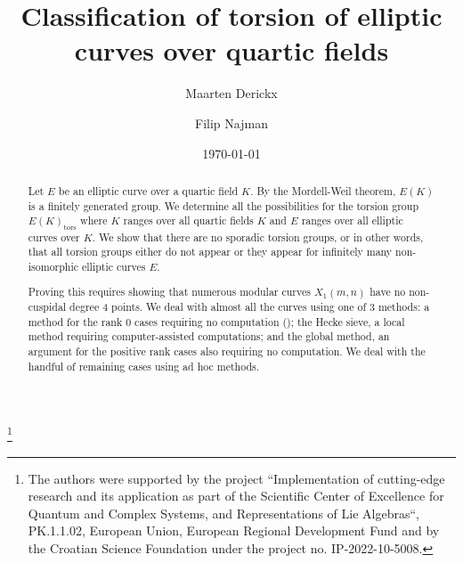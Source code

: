 \documentclass[11pt,reqno]{amsart}
\title{Classification of torsion of elliptic curves over quartic fields}
\date{\today}
\theoremstyle{definition}
\numberwithin{equation}{section}
\newcommand{\tor}{\mathrm{tors}}
\begin{document}
\begin{abstract}
Let $E$ be an elliptic curve over a quartic field $K$. By the Mordell-Weil theorem, $E(K)$ is a finitely generated group. We determine all the possibilities for the torsion group $E(K)_\tor$ where $K$ ranges over all quartic fields $K$ and $E$ ranges over all elliptic curves over $K$. We show that there are no sporadic torsion groups, or in other words, that all torsion groups either do not appear or they appear for infinitely many non-isomorphic elliptic curves $E$.

Proving this requires showing that numerous modular curves $X_1(m,n)$ have no non-cuspidal degree $4$ points. We deal with almost all the curves using one of 3 methods: a method for the rank 0 cases requiring no computation (); the Hecke sieve, a local method requiring computer-assisted computations; and the global method, an argument for the positive rank cases also requiring no computation. We deal with the handful of remaining cases using ad hoc methods.



\end{abstract}

\author[Derickx]{Maarten Derickx}
\address{Maarten Derickx, University of Zagreb, Faculty of Science, Department of Mathematics, Bijeni\v{c}ka Cesta 30, 10000 Zagreb, Croatia}


\author[Najman]{Filip Najman}
\address{Filip Najman, University of Zagreb, Faculty of Science, Department of Mathematics, Bijeni\v{c}ka Cesta 30, 10000 Zagreb, Croatia}
\thanks{The authors were supported by the  project “Implementation of cutting-edge research and its application as part of the Scientific Center of Excellence for Quantum and Complex Systems, and Representations of Lie Algebras“, PK.1.1.02, European Union, European Regional Development Fund and by the Croatian Science Foundation under the project no. IP-2022-10-5008.}



\maketitle
\end{document}
